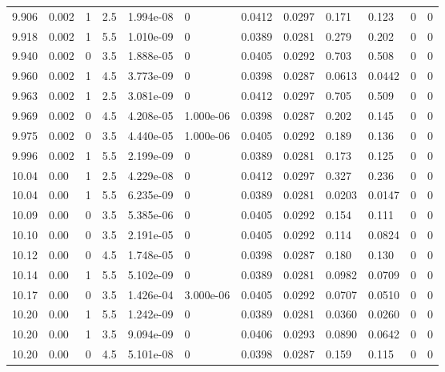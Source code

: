 \documentclass[preview]{standalone}
\begin{document}
{{{{{{{\begin{tabular}{L{1.2cm}C{1.2cm} C{0.3cm}C{0.5cm} C{1.4cm}C{1.4cm} C{1.4cm}C{1.4cm} C{1.6cm}C{1.6cm} C{1.6cm}C{1.6cm}}
  9.906  &  0.002  & 1     & 2.5 &  1.994e-08  & 0  &  0.0412&   0.0297& 0.171 & 0.123   &  0 & 0  \\ 
  9.918  &  0.002  & 1     & 5.5 &  1.010e-09  & 0  &  0.0389&   0.0281& 0.279 & 0.202   &  0 & 0  \\ 
  9.940  &  0.002  & 0     & 3.5 &  1.888e-05  & 0  &  0.0405&   0.0292& 0.703 & 0.508   &  0 & 0  \\ 
  9.960  &  0.002  & 1     & 4.5 &  3.773e-09  & 0  &  0.0398&   0.0287& 0.0613 & 0.0442   &  0 & 0  \\ 
  9.963  &  0.002  & 1     & 2.5 &  3.081e-09  & 0  &  0.0412&   0.0297& 0.705 & 0.509   &  0 & 0  \\ 
  9.969  &  0.002  & 0     & 4.5 &  4.208e-05  & 1.000e-06  &  0.0398&   0.0287& 0.202 & 0.145   &  0 & 0  \\ 
  9.975  &  0.002  & 0     & 3.5 &  4.440e-05  & 1.000e-06  &  0.0405&   0.0292& 0.189 & 0.136   &  0 & 0  \\ 
  9.996  &  0.002  & 1     & 5.5 &  2.199e-09  & 0  &  0.0389&   0.0281& 0.173 & 0.125   &  0 & 0  \\ 
  10.04  &  0.00  & 1     & 2.5 &  4.229e-08  & 0  &  0.0412&   0.0297& 0.327 & 0.236   &  0 & 0  \\ 
  10.04  &  0.00  & 1     & 5.5 &  6.235e-09  & 0  &  0.0389&   0.0281& 0.0203 & 0.0147   &  0 & 0  \\ 
  10.09  &  0.00  & 0     & 3.5 &  5.385e-06  & 0  &  0.0405&   0.0292& 0.154 & 0.111   &  0 & 0  \\ 
  10.10  &  0.00  & 0     & 3.5 &  2.191e-05  & 0  &  0.0405&   0.0292& 0.114 & 0.0824   &  0 & 0  \\ 
  10.12  &  0.00  & 0     & 4.5 &  1.748e-05  & 0  &  0.0398&   0.0287& 0.180 & 0.130   &  0 & 0  \\ 
  10.14  &  0.00  & 1     & 5.5 &  5.102e-09  & 0  &  0.0389&   0.0281& 0.0982 & 0.0709   &  0 & 0  \\ 
  10.17  &  0.00  & 0     & 3.5 &  1.426e-04  & 3.000e-06  &  0.0405&   0.0292& 0.0707 & 0.0510   &  0 & 0  \\ 
  10.20  &  0.00  & 1     & 5.5 &  1.242e-09  & 0  &  0.0389&   0.0281& 0.0360 & 0.0260   &  0 & 0  \\ 
  10.20  &  0.00  & 1     & 3.5 &  9.094e-09  & 0  &  0.0406&   0.0293& 0.0890 & 0.0642   &  0 & 0  \\ 
  10.20  &  0.00  & 0     & 4.5 &  5.101e-08  & 0  &  0.0398&   0.0287& 0.159 & 0.115   &  0 & 0  \\ 

\end{tabular}}}}}}}}
\end{document}

